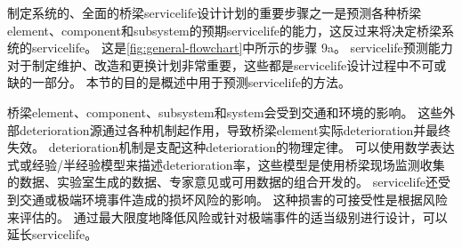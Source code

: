 制定系统的、全面的桥梁\gls*{servicelife}设计计划的重要步骤之一是预测各种桥梁\gls*{element}、\gls*{component}和\gls*{subsystem}的预期\gls*{servicelife}的能力，这反过来将决定桥梁系统的\gls*{servicelife}。 这是\cref{fig:general-flowchart}中所示的步骤 9a。 \gls*{servicelife}预测能力对于制定维护、改造和更换计划非常重要，这些都是\gls*{servicelife}设计过程中不可或缺的一部分。 本节的目的是概述中用于预测\gls*{servicelife}的方法。

桥梁\gls*{element}、\gls*{component}、\gls*{subsystem}和\gls*{system}会受到交通和环境的影响。 这些外部\gls*{deterioration}源通过各种机制起作用，导致桥梁\gls{element}实际\gls*{deterioration}并最终失效。 \gls*{deterioration}机制是支配这种\gls*{deterioration}的物理定律。 可以使用数学表达式或经验/半经验模型来描述\gls*{deterioration}率，这些模型是使用桥梁现场监测收集的数据、实验室生成的数据、专家意见或可用数据的组合开发的。 \gls*{servicelife}还受到交通或极端环境事件造成的损坏风险的影响。 这种损害的可接受性是根据风险来评估的。 通过最大限度地降低风险或针对极端事件的适当级别进行设计，可以延长\gls*{servicelife}。

